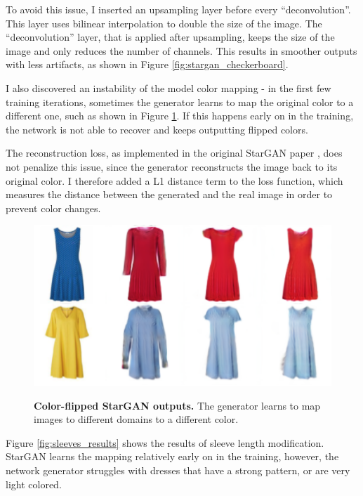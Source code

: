 \documentclass[12pt]{report}
\begin{document}
To avoid this issue, I inserted an upsampling layer before every ``deconvolution''. This layer uses bilinear interpolation to double the size of the image. The ``deconvolution'' layer, that is applied after upsampling, keeps the size of the image and only reduces the number of channels. This results in smoother outputs with less artifacts, as shown in Figure \ref{fig:stargan_checkerboard}.

I also discovered an instability of the model color mapping - in the first few training iterations, sometimes the generator learns to map the original color to a different one, such as shown in Figure \ref{fig:stargan_color}. If this happens early on in the training, the network is not able to recover and keeps outputting flipped colors.

The reconstruction loss, as implemented in the original StarGAN paper \cite{choi_stargan_2017}, does not penalize this issue, since the generator reconstructs the image back to its original color. I therefore added a L1 distance term to the loss function, which measures the distance between the generated and the real image in order to prevent color changes.

\begin{figure}[h]
\centering
{\includegraphics[width=.7\linewidth]{04_experiments/stargan/color_flip}}
\caption{\label{fig:stargan_color} \textbf{Color-flipped StarGAN outputs.} The generator learns to map images to different domains to a different color.}
\end{figure}

Figure \ref{fig:sleeves_results} shows the results of sleeve length modification. StarGAN learns the mapping relatively early on in the training, however, the network generator struggles with dresses that have a strong pattern, or are very light colored.
\end{document}
